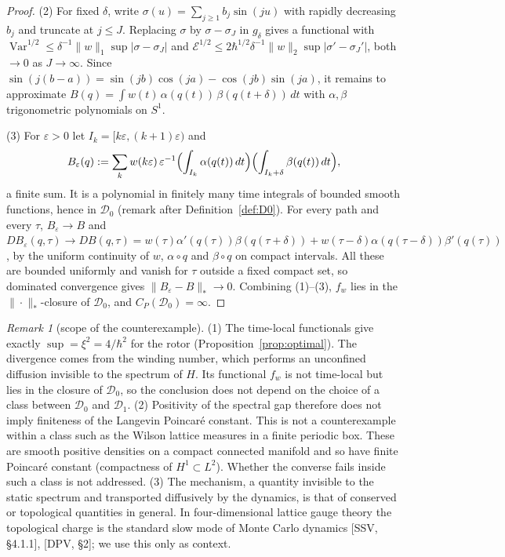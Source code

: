 \documentclass[11pt,a4paper]{article}
\theoremstyle{definition}
\theoremstyle{remark}
\newtheorem{remark}[theorem]{Remark}
\newcommand{\Var}{\operatorname{Var}}
\newcommand{\cE}{\mathcal{E}}
\newcommand{\cD}{\mathcal{D}}
\begin{document}
\begin{proof}
(2) For fixed $\delta$, write $\sigma(u)=\sum_{j\ge1}b_j\sin(ju)$ with rapidly decreasing $b_j$ and truncate at $j\le J$.
Replacing $\sigma$ by $\sigma-\sigma_J$ in $g_\delta$ gives a functional with $\Var^{1/2}\le\delta^{-1}\|w\|_1\sup|\sigma-\sigma_J|$ and $\cE^{1/2}\le2\hbar^{1/2}\delta^{-1}\|w\|_2\sup|\sigma'-\sigma_J'|$, both $\to0$ as $J\to\infty$.
Since $\sin(j(b-a))=\sin(jb)\cos(ja)-\cos(jb)\sin(ja)$, it remains to approximate $B(q)=\int w(t)\,\alpha(q(t))\,\beta(q(t+\delta))\,dt$ with $\alpha,\beta$ trigonometric polynomials on $S^1$.

(3) For $\varepsilon>0$ let $I_k=[k\varepsilon,(k+1)\varepsilon)$ and
\[
  B_\varepsilon(q):=\sum_kw(k\varepsilon)\,\varepsilon^{-1}\Bigl(\int_{I_k}\alpha(q(t))\,dt\Bigr)\Bigl(\int_{I_k+\delta}\beta(q(t))\,dt\Bigr),
\]
a finite sum. It is a polynomial in finitely many time integrals of bounded smooth functions, hence in $\cD_0$ (remark after Definition~\ref{def:D0}).
For every path and every $\tau$, $B_\varepsilon\to B$ and $DB_\varepsilon(q,\tau)\to DB(q,\tau)=w(\tau)\alpha'(q(\tau))\beta(q(\tau+\delta))+w(\tau-\delta)\alpha(q(\tau-\delta))\beta'(q(\tau))$, by the uniform continuity of $w$, $\alpha\circ q$ and $\beta\circ q$ on compact intervals.
All these are bounded uniformly and vanish for $\tau$ outside a fixed compact set, so dominated convergence gives $\|B_\varepsilon-B\|_*\to0$.
Combining (1)--(3), $f_w$ lies in the $\|\cdot\|_*$-closure of $\cD_0$, and $C_P(\cD_0)=\infty$.
\end{proof}



\begin{remark}[scope of the counterexample]\label{rem:rotorscope}
(1) The time-local functionals give exactly $\sup=\xi^2=4/\hbar^2$ for the rotor (Proposition~\ref{prop:optimal}). The divergence comes from the winding number, which performs an unconfined diffusion invisible to the spectrum of $H$. Its functional $f_w$ is not time-local but lies in the closure of $\cD_0$, so the conclusion does not depend on the choice of a class between $\cD_0$ and $\cD_1$.
(2) Positivity of the spectral gap therefore does not imply finiteness of the Langevin Poincar\'e constant.
This is not a counterexample within a class such as the Wilson lattice measures in a finite periodic box.
These are smooth positive densities on a compact connected manifold and so have finite Poincar\'e constant (compactness of $H^1\subset L^2$).
Whether the converse fails inside such a class is not addressed.
(3) The mechanism, a quantity invisible to the static spectrum and transported diffusively by the dynamics, is that of conserved or topological quantities in general.
In four-dimensional lattice gauge theory the topological charge is the standard slow mode of Monte Carlo dynamics [SSV, \S4.1.1], [DPV, \S2]; we use this only as context.
\end{remark}
\end{document}
